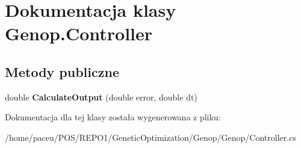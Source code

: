 \hypertarget{classGenop_1_1Controller}{}\section{Dokumentacja klasy Genop.\+Controller}
\label{classGenop_1_1Controller}
\subsection*{Metody publiczne}
\begin{DoxyCompactItemize}
\item 
double {\bfseries Calculate\+Output} (double error, double dt)\hypertarget{classGenop_1_1Controller_ae5fd8ff66bb482c175bd02aa2366a336}{}\label{classGenop_1_1Controller_ae5fd8ff66bb482c175bd02aa2366a336}

\end{DoxyCompactItemize}


Dokumentacja dla tej klasy została wygenerowana z pliku\+:\begin{DoxyCompactItemize}
\item 
/home/paceu/\+P\+O\+S/\+R\+E\+P\+O1/\+Genetic\+Optimization/\+Genop/\+Genop/Controller.\+cs\end{DoxyCompactItemize}
